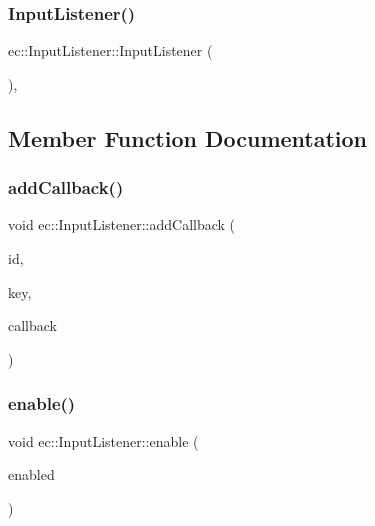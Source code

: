 \mbox{\label{classec_1_1_input_listener_aa44d25c2b2d3ef5e72611831fd66e10c}} 
\subsubsection{\texorpdfstring{Input\+Listener()}{InputListener()}}
{\footnotesize\ttfamily ec\+::\+Input\+Listener\+::\+Input\+Listener (\begin{DoxyParamCaption}{ }\end{DoxyParamCaption})\hspace{0.3cm}{\ttfamily [explicit]}, {\ttfamily [protected]}}



\subsection{Member Function Documentation}
\mbox{\label{classec_1_1_input_listener_a028ec5ed34aeb8b1377af91c2811bedb}} 
\subsubsection{\texorpdfstring{add\+Callback()}{addCallback()}}
{\footnotesize\ttfamily void ec\+::\+Input\+Listener\+::add\+Callback (\begin{DoxyParamCaption}\item[{const std\+::string \&}]{id,  }\item[{\mbox{\hyperlink{namespaceec_a5de6bdb8c4b2ed6e590e721ec998f964}{Event\+Key\+\_\+T}}}]{key,  }\item[{std\+::function$<$ void()$>$}]{callback }\end{DoxyParamCaption})}

\mbox{\label{classec_1_1_input_listener_a459a44443e7de70e854c2175b6c6914d}} 
\subsubsection{\texorpdfstring{enable()}{enable()}}
{\footnotesize\ttfamily void ec\+::\+Input\+Listener\+::enable (\begin{DoxyParamCaption}\item[{bool}]{enabled }\end{DoxyParamCaption})\hspace{0.3cm}{\ttfamily [virtual]}}

